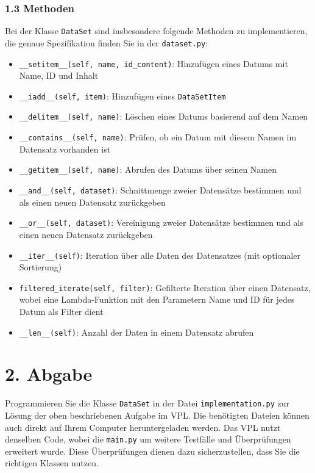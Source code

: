 \documentclass{article}
\begin{document}
\subsubsection*{1.3 Methoden}
Bei der Klasse \texttt{DataSet} sind insbesondere folgende Methoden zu implementieren, die genaue Spezifikation finden Sie in der \texttt{dataset.py}:
\begin{itemize}
    \item \texttt{\_\_setitem\_\_(self, name, id\_content)}: Hinzufügen eines Datums mit Name, ID und Inhalt
    \item \texttt{\_\_iadd\_\_(self, item)}: Hinzufügen eines \texttt{DataSetItem}
    \item \texttt{\_\_delitem\_\_(self, name)}: Löschen eines Datums basierend auf dem Namen
    \item \texttt{\_\_contains\_\_(self, name)}: Prüfen, ob ein Datum mit diesem Namen im Datensatz vorhanden ist
    \item \texttt{\_\_getitem\_\_(self, name)}: Abrufen des Datums über seinen Namen
    \item \texttt{\_\_and\_\_(self, dataset)}: Schnittmenge zweier Datensätze bestimmen und als einen neuen Datensatz zurückgeben
    \item \texttt{\_\_or\_\_(self, dataset)}: Vereinigung zweier Datensätze bestimmen und als einen neuen Datensatz zurückgeben
    \item \texttt{\_\_iter\_\_(self)}: Iteration über alle Daten des Datensatzes (mit optionaler Sortierung)
    \item \texttt{filtered\_iterate(self, filter)}: Gefilterte Iteration über einen Datensatz, wobei eine Lambda-Funktion mit den Parametern Name und ID für jedes Datum als Filter dient
    \item \texttt{\_\_len\_\_(self)}: Anzahl der Daten in einem Datensatz abrufen
\end{itemize}

\section*{2. Abgabe}
Programmieren Sie die Klasse \texttt{DataSet} in der Datei \texttt{implementation.py} zur Lösung der oben beschriebenen Aufgabe im VPL. Die benötigten Dateien können auch direkt auf Ihrem Computer heruntergeladen werden. Das VPL nutzt denselben Code, wobei die \texttt{main.py} um weitere Testfälle und Überprüfungen erweitert wurde. Diese Überprüfungen dienen dazu sicherzustellen, dass Sie die richtigen Klassen nutzen.
\end{document}
